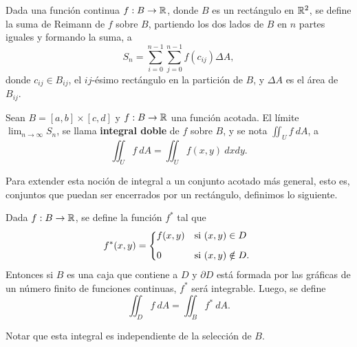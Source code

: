 \begin{definition}
Dada una funci\'on continua $f:B\to\mathbb{R}$, donde $B$ es un rect\'angulo en $\mathbb{R}^2$, se define la suma de Reimann de $f$ sobre $B$, partiendo los dos lados de $B$ en $n$ partes iguales y formando la suma, a
\[
    S_n=\sum_{i=0}^{n-1}\sum_{j=0}^{n-1} f(c_{ij})\Delta A,
\]  
donde $c_{ij}\in B_{ij}$, el $ij$-\'esimo rect\'angulo en la partici\'on de $B$, y $\Delta A$ es el \'area de $B_{ij}$.
\end{definition}

\begin{definition} 
    Sean $B=[a,b]\times[c,d]$ y $f:B\to\mathbb{R}$ una funci\'on acotada. El l\'imite $\lim_{n\to\infty}S_n$, se llama \textbf{integral doble} de $f$ sobre $B$, y se nota $\iint_U f\:dA$, a
    \[
          \iint_U f\:dA=\iint_U f(x,y)\:dxdy.
    \]
\end{definition}

Para extender esta noci\'on de integral a un conjunto acotado m\'as general, esto es, conjuntos que puedan ser encerrados por un rect\'angulo, definimos lo siguiente. 

\begin{definition}
Dada $f:B\to\mathbb{R}$, se define la funci\'on $f^*$ tal que
\[
    f^*(x,y)=
    \begin{dcases*}
        f(x,y) & si $(x,y)\in D$ \\[.2cm]
        0        & si $(x,y)\notin D.$
    \end{dcases*}
\]
Entonces si $B$ es una caja que contiene a $D$ y $\partial D$ est\'a formada por las gr\'aficas de un n\'umero finito de funciones continuas, $f^*$ ser\'a integrable. Luego, se define
\[
    \iint_D f\:dA=\iint_B f^*\:dA.  
\]
\end{definition}

\begin{obs} 
    Notar que esta integral es independiente de la selecci\'on de $B$.
\end{obs}

